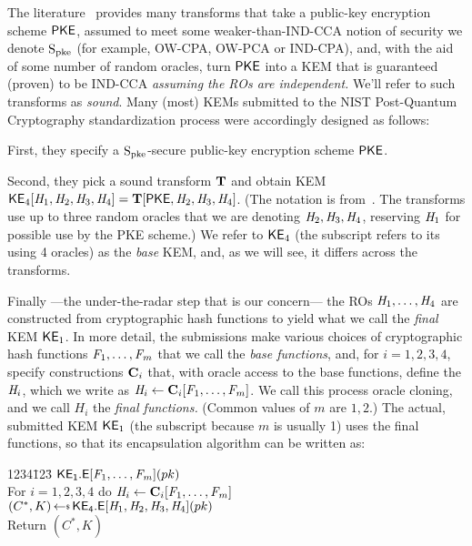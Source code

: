 The literature~\cite{TCC:HofHovKil17,IMA:Dent03,EC:SaiXagYam18,C:JZCWM18} provides many transforms that take a public-key encryption scheme ${\mathsf{PKE}}$, assumed to meet some weaker-than-IND-CCA notion of security we denote $\mathrm{S}_{\mathrm{pke}}$ (for example, OW-CPA, OW-PCA or IND-CPA), and, with the aid of some number of random oracles, turn ${\mathsf{PKE}}$ into a KEM that is guaranteed (proven) to be IND-CCA \textit{assuming the ROs are independent.} We'll refer to such transforms as \textit{sound}. Many (most) KEMs submitted to the NIST Post-Quantum Cryptography standardization process were accordingly designed as follows:
\begin{bignewenum}
	\item First, they specify a $\mathrm{S}_{\mathrm{pke}}$-secure public-key encryption scheme ${\mathsf{PKE}}$. 
\item Second, they pick a sound transform $\mathbf{T}$ and obtain KEM ${\mathsf{KE}}_{4}[\mathit{H}_1,\mathit{H}_2,\mathit{H}_3,\mathit{H}_4] \allowbreak = \allowbreak \mathbf{T}[{\mathsf{PKE}},\mathit{H}_2,\mathit{H}_3,\mathit{H}_4]$. (The notation is from~\cite{TCC:HofHovKil17}. The transforms use up to three random oracles that we are denoting $\mathit{H}_2,\mathit{H}_3,\mathit{H}_4$, reserving $\mathit{H}_1$ for possible use by the PKE scheme.) We refer to ${\mathsf{KE}}_{4}$ (the subscript refers to its using 4 oracles) as the \textit{base} KEM, and, as we will see, it differs across the transforms.
\item Finally ---the under-the-radar step that is our concern--- the ROs $\mathit{H}_1,\ldots,\mathit{H}_4$ are constructed from cryptographic hash functions to yield what we call the \textit{final} KEM ${\mathsf{KE}}_{1}$. In more detail, the submissions make various choices of cryptographic hash functions $\mathit{F}_1,\ldots,\mathit{F}_m$ that we call the \textit{base functions}, and, for $i=1,2,3,4$, specify constructions $\mathbf{C}_i$ that, with oracle access to the base functions, define the $\mathit{H}_i$, which we write as $\mathit{H}_i \gets \mathbf{C}_i[\mathit{F}_1,\ldots,\mathit{F}_m]$. We call this process oracle cloning, and we call $H_i$ the \textit{final functions.} (Common values of $m$ are $1,2$.) The actual, submitted KEM ${\mathsf{KE}}_{1}$ (the subscript because $m$ is usually 1) uses the final functions, so that its encapsulation algorithm can be written as: 
\begin{tabbing}
	1234\=123\=\kill
\>	\underline{$\mathsf{{\mathsf{KE}}_{1}.E}[\mathit{F}_1,\ldots,\mathit{F}_m](pk)$} \\[2pt]
\> For $i=1,2,3,4$ do $\mathit{H}_i \gets \mathbf{C}_i[\mathit{F}_1,\ldots,\mathit{F}_m]$ \\
\> $(C^*,K)\getsr \GkemEnc{4}[\aFunc{H}_1,\aFunc{H}_2,\aFunc{H}_3,\aFunc{H}_4](\pk)$ \\
\> Return $(C^*,K)$
\end{tabbing}
\end{bignewenum} 
